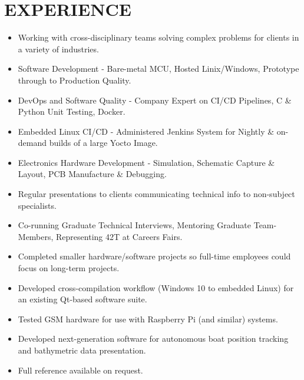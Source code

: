 \section{EXPERIENCE}
{
  {\begin{itemize}
      \item Working with cross-disciplinary teams solving complex problems for clients in a variety of industries. 
      \item Software Development - Bare-metal MCU, Hosted Linix/Windows, Prototype through to Production Quality. 
      \item DevOps and Software Quality - Company Expert on CI/CD Pipelines, C \& Python Unit Testing, Docker.
      \item Embedded Linux CI/CD - Administered Jenkins System for Nightly \& on-demand builds of a large Yocto Image.
      \item Electronics Hardware Development - Simulation, Schematic Capture \& Layout, PCB Manufacture \& Debugging.
      \item Regular presentations to clients communicating technical info to non-subject specialists.
      \item Co-running Graduate Technical Interviews, Mentoring Graduate Team-Members, Representing 42T at Careers Fairs. 
  \end{itemize}
  }
}
  
{
  {\begin{itemize}
      \item Completed smaller hardware/software projects so full-time employees could focus on long-term projects.
      \item Developed cross-compilation workflow (Windows 10 to embedded Linux) for an existing Qt-based software suite.
      \item Tested GSM hardware for use with Raspberry Pi (and similar) systems.   
      \item Developed next-generation software for autonomous boat position tracking and bathymetric data presentation.
      \item Full reference available on request.
  \end{itemize}
  }
}


